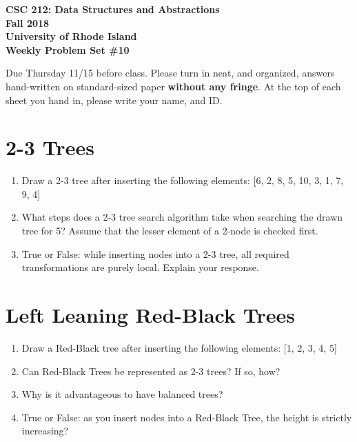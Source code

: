 \documentclass[11pt]{article}
\begin{document}
    \thispagestyle{empty}
    
    \begin{center}
        {\Large\bf CSC 212: Data Structures and Abstractions}\\
        \medskip
        {\Large\bf Fall 2018}\\
        \medskip
        {\Large\bf University of Rhode Island}\\
        \bigskip
        {\Large\bf Weekly Problem Set \#10}
    \end{center}
    
    Due Thursday 11/15 before class. Please turn in neat, and organized, answers hand-written on standard-sized paper \textbf{without any fringe}. At the top of each sheet you hand in, please write your name, and ID.
    \section{2-3 Trees}
\begin{enumerate}
    \item Draw a 2-3 tree after inserting the following elements: [6, 2, 8, 5, 10, 3, 1, 7, 9, 4]

    \item What steps does a 2-3 tree search algorithm take when searching the drawn tree for 5? Assume that the lesser element of a 2-node is checked first.
    
    \item True or False: while inserting nodes into a 2-3 tree, all required transformations are purely local. Explain your response.
    
\end{enumerate}

\section{Left Leaning Red-Black Trees}
\begin{enumerate}
    \item Draw a Red-Black tree after inserting the following elements: [1, 2, 3, 4, 5]

    \item Can Red-Black Trees be represented as 2-3 trees? If so, how?

    \item Why is it advantageous to have balanced trees?

    \item True or False: as you insert nodes into a Red-Black Tree, the height is strictly increasing?
\end{enumerate}
    
    \label{r:lastpage}
    
    
\end{document}
